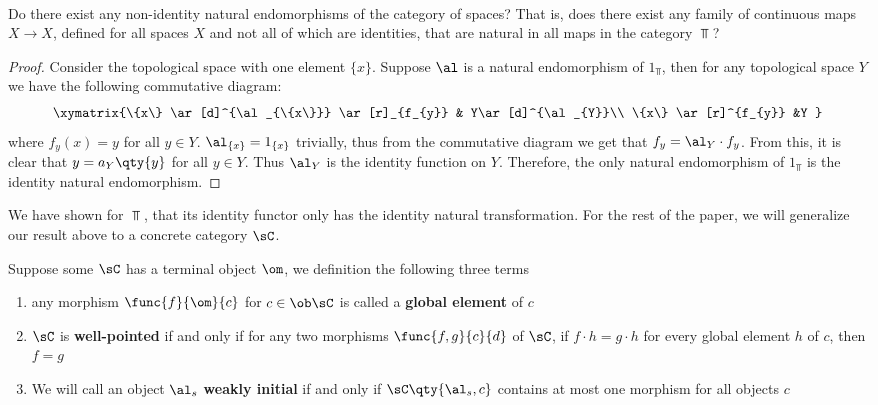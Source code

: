 \documentclass[../../main]{subfiles}
\begin{document}
\paragraph{}
\begin{exercise}
	Do there exist any non-identity natural endomorphisms of the category of
	spaces? That is, does there exist any family of continuous maps
	$X\rightarrow X$, defined for all spaces $X$ and not all of which are
	identities, that are natural in all maps in the category $\Top$?
\end{exercise}

\begin{proof}
	Consider the topological space with one element $\{x\}$. Suppose $\al$ is a
	natural endomorphism of $1_{\Top}$, then for any topological space $Y$ we
	have the following commutative diagram:
	\[\xymatrix{\{x\} \ar[d]^{\al_{\{x\}}} \ar[r]_{f_{y}} & Y\ar[d]^{\al_{Y}}\\
	\{x\} \ar[r]^{f_{y}} &Y  }\] where $f_{y}(x) = y$ for all $y \in Y$.
	$\al_{\{x\}} = 1_{\{x\}}$ trivially, thus from the commutative diagram we
	get that $f_{y} = \al_{Y}\cdot f_{y}$. From this, it is clear that $y =
	a_{Y}\qty{y}$ for all $y \in Y$. Thus $\al_{Y}$ is the identity function on
	$Y$. Therefore, the only natural endomorphism of $1_{\Top}$ is the identity
	natural endomorphism.
\end{proof}

We have shown for $\Top$, that its identity functor only has the identity
natural transformation. For the rest of the paper, we will generalize our result
above to a concrete category $\sC$.

\begin{definition}
	Suppose some $\sC$ has a terminal object $\om$, we definition the following
	three terms
	\begin{enumerate}
		\item any morphism $\func{f}{\om}{c}$ for $c \in \ob \sC$ is called a
			{\bf global element} of $c$
		\item $\sC$ is {\bf well-pointed} if and only if for any two morphisms
			$\func{f,g}{c}{d}$ of $\sC$, if $f \cdot h = g \cdot h$ for every
			global element $h$ of $c$, then $f = g$
		\item We will call an object $\al_{s}$ {\bf weakly initial} if and only
			if $\sC\qty{\al_{s},c}$ contains at most one morphism for all
			objects $c$
	\end{enumerate}
\end{definition}
\end{document}
